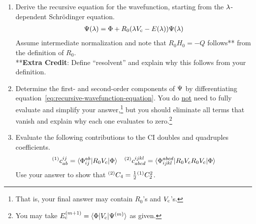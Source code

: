 \documentclass[11pt]{article}
\begin{document}
\begin{enumerate}
\item
Derive the recursive equation for the wavefunction, starting from the $\lambda $-dependent Schr\"odinger equation.
\begin{align}
\label{eq:recursive-wavefunction-equation}
  \Psi (\lambda )
=
  \Phi 
+
  R_0
  (
    \lambda  V_{\mathrm{c}}
  -
    E(\lambda )
  )
  \Psi (\lambda )
\end{align}
Assume intermediate normalization and note that $R_0H_0=-Q$ follows** from the definition of $R_0$.\\[10pt]
**\textbf{Extra Credit}: Define ``resolvent'' and explain why this follows from your definition.


\newpage
\item
Determine the first- and second-order components of $\Psi $ by differentiating equation~\ref{eq:recursive-wavefunction-equation}.
You do \ul{not} need to fully evaluate and simplify your answer,\footnote{That is, your final answer may contain $R_0$'s and $V_{\mathrm{c}}$'s.} but you should eliminate all terms that vanish and explain why each one evaluates to zero.\footnote{You may take $E_{\mathrm{c}}^{(m+1)}=\langle\Phi |V_{\mathrm{c}}|\Psi ^{(m)}\rangle$ as given.}


\newpage
\item
Evaluate the following contributions to the CI doubles and quadruples coefficients.
\begin{align}
  {}^{(1)}
  c_{ab}^{ij}
=
  \langle\Phi _{ij}^{ab}|
    R_0V_{\mathrm{c}}
  |\Phi \rangle
&&
  {}^{(2)}
  c_{abcd}^{ijkl}
=
  \langle\Phi _{ijkl}^{abcd}|
    R_0V_{\mathrm{c}}R_0V_{\mathrm{c}}
  |\Phi \rangle
\end{align}
Use your answer to show that ${}^{(2)}C_4=\tfrac{1}{2}{}^{(1)}C_2^2$.


\end{enumerate}
\end{document}
